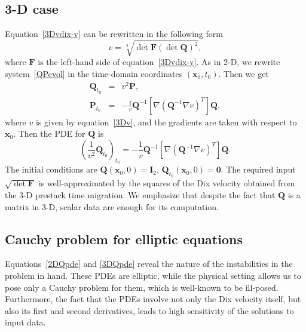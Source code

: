 \subsection{3-D case}
Equation~\ref{3Dvdix-v} can be rewritten in the following form
\begin{equation}
\label{3Dv}
v=\sqrt[4]{\det\mathbf{F}(\det\mathbf{Q})^2},
\end{equation}
where $\mathbf{F}$ is the left-hand side of equation~\ref{3Dvdix-v}.
As in 2-D, we rewrite system~\ref{QPevol} in the time-domain
coordinates $(\mathbf{x}_0,t_0)$. Then we get
\begin{eqnarray}
\mathbf{Q}_{t_0}&=&v^2\mathbf{P},\label{3DQ}\\
\mathbf{P}_{t_0}&=&-\frac{1}{v}\mathbf{Q}^{-1}\left[
\nabla\left(\mathbf{Q}^{-1}\nabla v\right)^T\right]\mathbf{Q},\label{3DP}
\end{eqnarray}
where $v$ is given by equation~\ref{3Dv}, and the gradients 
are taken with respect to $\mathbf{x}_0$.
Then the PDE for $\mathbf{Q}$ is
\begin{equation}
\label{3DQpde}
\left(\frac{1}{v^2}\mathbf{Q}_{t_0}\right)_{t_0}=
-\frac{1}{v}\mathbf{Q}^{-1}\left[
\nabla\left(\mathbf{Q}^{-1}\nabla v\right)^T\right]\mathbf{Q}.
\end{equation}
The initial conditions are $\mathbf{Q}(\mathbf{x}_0,0)=\mathbf{I}_2$,
$\mathbf{Q}_{t_0}(\mathbf{x}_0,0)=\mathbf{0}$.
The required input $\sqrt{\det\mathbf{F}}$ is well-approximated
by the squares of the Dix velocity obtained
from the 3-D prestack time migration.
We emphasize that despite the fact that $\mathbf{Q}$ is a 
matrix in 3-D, scalar data are enough for its computation.

\subsection{Cauchy problem for elliptic equations}
Equations~\ref{2DQpde} and \ref{3DQpde} reveal the nature of the
instabilities in the problem in hand.  These PDEs are elliptic, while
the physical setting allows us to pose only a Cauchy problem for
them, which is well-known to be ill-posed.  Furthermore, the fact that
the PDEs involve not only the Dix velocity itself, but also its first
and second derivatives, leads to high sensitivity of the solutions to
input data.
 
